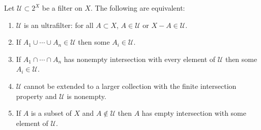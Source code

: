 Let $\mathcal{U} \subset 2^X$ be a filter on $X$. The following are equivalent:

\begin{enumerate}
\item $\mathcal{U}$ is an ultrafilter: for all $A \subset X$, $A \in \mathcal{U}$ or $X - A \in \mathcal{U}$.
\item If $A_1 \cup \cdots \cup A_n \in \mathcal{U}$ then some $A_i \in \mathcal{U}$.
\item If $A_1 \cap \cdots \cap A_n$ has nonempty intersection with every element of $\mathcal{U}$ then some $A_i \in \mathcal{U}$.
\item $\mathcal{U}$ cannot be extended to a larger collection with the finite intersection property and $\mathcal{U}$ is nonempty.
\item If $A$ is a subset of $X$ and $A \notin \mathcal{U}$ then $A$ has empty intersection with some element of $\mathcal{U}$.
\end{enumerate}
